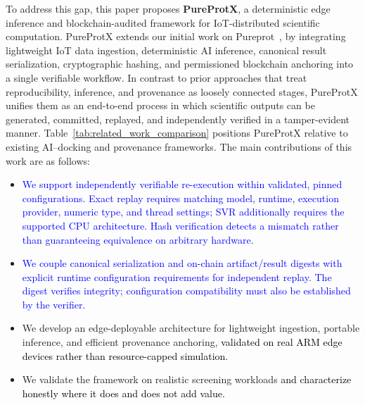 \documentclass[conference]{IEEEtran}
\newcommand{\rev}[2]{\textcolor{blue}{#2}}
\begin{document}
To address this gap, this paper proposes \textbf{PureProtX}, a deterministic edge inference and blockchain-audited framework for IoT-distributed scientific computation. PureProtX extends our initial work on Pureprot~\cite{kanu2025pureprot}, by integrating lightweight IoT data ingestion, deterministic AI inference, canonical result serialization, cryptographic hashing, and permissioned blockchain anchoring into a single verifiable workflow. In contrast to prior approaches that treat reproducibility, inference, and provenance as loosely connected stages, PureProtX unifies them as an end-to-end process in which scientific outputs can be generated, committed, replayed, and independently verified in a tamper-evident manner. Table~\ref{tab:related_work_comparison} positions PureProtX relative to existing AI--docking and provenance frameworks.
The main contributions of this work are as follows:  
\begin{itemize}
    \item \rev{R1.1}{We support independently verifiable re-execution
    within validated, pinned configurations. Exact replay requires
    matching model, runtime, execution provider, numeric type, and
    thread settings; SVR additionally requires the supported CPU
    architecture. Hash verification detects a mismatch rather than
    guaranteeing equivalence on arbitrary hardware.}

    \item \rev{R1.1}{We couple canonical serialization and
    on-chain artifact/result digests with explicit runtime
    configuration requirements for independent replay. The digest
    verifies integrity; configuration compatibility must also
    be established by the verifier.}
    \item We develop an edge-deployable architecture for
    lightweight ingestion, portable inference, and efficient
    provenance anchoring, \textcolor{black}{validated on real ARM
    edge devices rather than resource-capped simulation.}
    \item We validate the framework on realistic screening
    workloads \textcolor{black}{and characterize honestly where
    it does and does not add value.}
\end{itemize}
\end{document}
